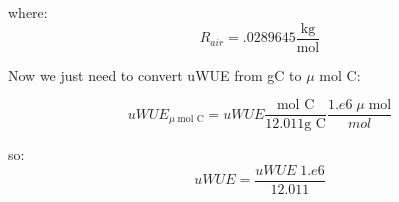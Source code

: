where:
\begin{equation}
  R_{air} = .0289645 \frac{\text{kg}}{\text{mol}}
\end{equation}

Now we just need to convert uWUE from gC to $\mu$ mol C:

\begin{equation}
uWUE_{\mu \; \text{mol C}} = uWUE \frac{ \text{mol C}}{12.011 \text{g C}} \frac{1.e6 \; \mu \; \text{mol}}{mol}
\end{equation}

so:
\begin{equation}
  uWUE = \frac{uWUE \;1.e6}{ 12.011}
\end{equation}

